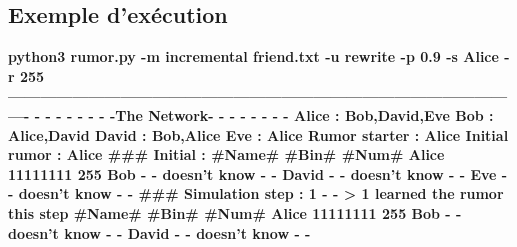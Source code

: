 \documentclass[a4paper,11pt]{article}
\begin{document}
\subsection{Exemple d'exécution}
{\textbf{
python3 rumor.py -m incremental friend.txt -u rewrite -p 0.9 -s Alice -r 255
\newline -------------------------------------------------------------------------------------------------
\newline - - - - - - - -The Network- - - - - - - -
\newline Alice : Bob,David,Eve
\newline Bob : Alice,David
\newline David : Bob,Alice
\newline Eve : Alice
\newline
\newline Rumor starter : Alice
\newline Initial rumor : Alice
\newline \#\#\#
\newline Initial :
\newline \#Name\# \hspace{1.3cm} \#Bin\# \hspace{1cm} \#Num\#
\newline Alice \hspace{1.5cm} 11111111 \hspace{1cm} 255
\newline Bob \hspace{1.7cm} - - doesn't know - -
\newline David \hspace{1.4cm} - - doesn't know - -
\newline Eve \hspace{1.7cm} - - doesn't know - -
\newline \#\#\# Simulation step : 1
\newline - - > 1 learned the rumor this step
\newline \#Name\# \hspace{1.3cm} \#Bin\# \hspace{1cm} \#Num\#
\newline Alice \hspace{1.5cm} 11111111 \hspace{1cm} 255
\newline Bob \hspace{1.7cm} - - doesn't know - -
\newline David \hspace{1.4cm} - - doesn't know - -
}}
\end{document}
